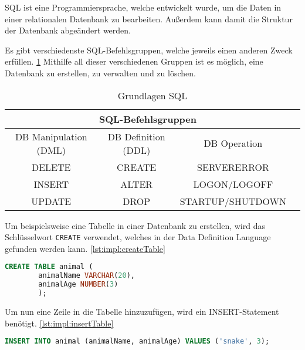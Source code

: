 
SQL ist eine Programmiersprache, welche entwickelt wurde, um die Daten in einer relationalen Datenbank zu bearbeiten. Außerdem kann damit die Struktur der Datenbank abgeändert werden. \cite{einfuerhungSQLBuch} 
 
Es gibt verschiedenste SQL-Befehlsgruppen, welche jeweils einen anderen Zweck erfüllen. \ref{tab:allgemein:grundlagenSQL}
Mithilfe all dieser verschiedenen Gruppen ist es möglich, eine Datenbank zu erstellen, zu verwalten und zu löschen.

\begin{table}
    \centering
    \begin{tabular}{ |c|c|c|c| }
     \hline
     \multicolumn{3}{|c|}{SQL-Befehlsgruppen } \\
     \hline
     \hline
     DB Manipulation (DML) & DB Definition (DDL) & DB Operation  \\
     \hline
     \hline
     DELETE & CREATE & SERVERERROR \\
     \hline
     INSERT & ALTER & LOGON/LOGOFF \\
     \hline
     UPDATE & DROP & STARTUP/SHUTDOWN \\
     \hline
    \end{tabular}
    \caption{Grundlagen SQL \cite{grundlagenSQL}}
    
    \label{tab:allgemein:grundlagenSQL}
\end{table}
 

 
Um beispielsweise eine Tabelle in einer Datenbank zu erstellen, wird das Schlüsselwort \texttt{CREATE} verwendet, welches in der Data Definition Language gefunden werden kann. \ref{lst:impl:createTable}
 
\begin{lstlisting}[language=sql,caption=CREATE table,label=lst:impl:createTable]
    CREATE TABLE animal (
        animalName VARCHAR(20),
        animalAge NUMBER(3)
        );
\end{lstlisting}
 
Um nun eine Zeile in die Tabelle hinzuzufügen, wird ein INSERT-Statement benötigt. \ref{lst:impl:insertTable}
 
\begin{lstlisting}[language=sql,caption=INSERT INTO table,label=lst:impl:insertTable]
        INSERT INTO animal (animalName, animalAge) VALUES ('snake', 3);
\end{lstlisting}
 
